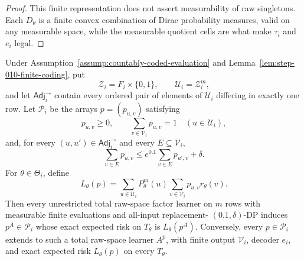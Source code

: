 \begin{proof}
This finite representation does not assert measurability of raw
singletons.  Each \(D_\theta\) is a finite convex combination of Dirac
probability measures, valid on any measurable space, while the measurable
quotient cells are what make \(\tau_i\) and \(e_i\) legal.
\end{proof}

\begin{proposition}
\label{prop:step-010-kernel-equivalence}
Under Assumption~\ref{assump:countably-coded-evaluation} and
Lemma~\ref{lem:step-010-finite-coding}, put
\begin{equation}\label{eq:step-010-input-alphabet}
\mathcal Z_i=F_i\times\{0,1\},
\qquad
\mathcal U_i=\mathcal Z_i^m,
\end{equation}
and let \(\mathsf{Adj}_i^{\to}\) contain every ordered pair of elements of
\(\mathcal U_i\) differing in exactly one row.  Let \(\mathcal P_i\) be
the arrays \(p=(p_{u,v})\) satisfying
\begin{equation}\label{eq:step-010-stochasticity}
p_{u,v}\ge0,
\qquad
\sum_{v\in\mathcal V_i}p_{u,v}=1
\quad(u\in\mathcal U_i),
\end{equation}
and, for every \((u,u')\in\mathsf{Adj}_i^{\to}\) and every
\(E\subseteq\mathcal V_i\),
\begin{equation}\label{eq:step-010-finite-dp}
\sum_{v\in E}p_{u,v}
\le e^{0.1}\sum_{v\in E}p_{u',v}+\delta.
\end{equation}
For \(\theta\in\Theta_i\), define
\begin{equation}\label{eq:step-010-payoff}
L_\theta(p)
=\sum_{u\in\mathcal U_i}P_\theta^m(u)
\sum_{v\in\mathcal V_i}p_{u,v}r_\theta(v).
\end{equation}
Then every unrestricted total raw-space factor learner on \(m\) rows with
measurable finite evaluations and all-input replacement-
\((0.1,\delta)\)-DP induces \(p^A\in\mathcal P_i\) whose exact expected
risk on \(T_\theta\) is \(L_\theta(p^A)\).  Conversely, every
\(p\in\mathcal P_i\) extends to such a total raw-space learner \(A^p\),
with finite output \(\mathcal V_i\), decoder \(e_i\), and exact expected
risk \(L_\theta(p)\) on every \(T_\theta\).
\end{proposition}

